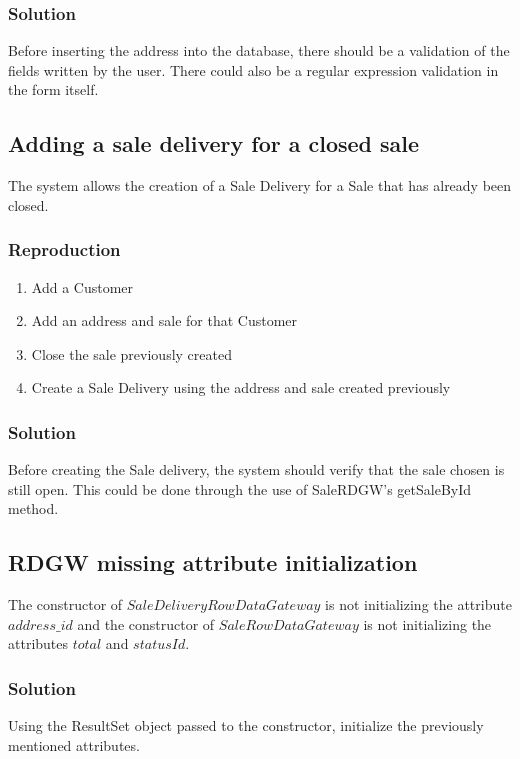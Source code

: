\documentclass[12pt]{article}
\begin{document}
\subsubsection{Solution}
Before inserting the address into the database, there should be a validation of the fields written by the user. There could also be a regular expression validation in the form itself.
\newpage
\subsection{Adding a sale delivery for a closed sale}
The system allows the creation of a Sale Delivery for a Sale that has already been closed.

\subsubsection{Reproduction}
\begin{enumerate}
   \item  Add a Customer
   
   \item  Add an address and sale for that Customer
   
   \item  Close the sale previously created
   
   \item  Create a Sale Delivery using the address and sale created previously
\end{enumerate}


\subsubsection{Solution}
Before creating the Sale delivery, the system should verify that the sale chosen is still open. This could be done through the use of SaleRDGW's getSaleById method.
\newpage
\subsection{RDGW missing attribute initialization}
The constructor of $SaleDeliveryRowDataGateway$ is not initializing the attribute $address\_id$ and the constructor of $SaleRowDataGateway$ is not initializing the attributes $total$ and $statusId$. 


\subsubsection{Solution}
Using the ResultSet object passed to the constructor, initialize the previously mentioned attributes.
\end{document}
